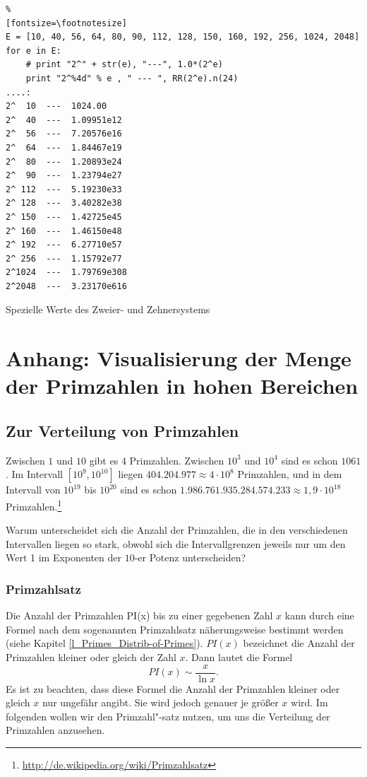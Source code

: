 \begin{refsegment}
\begin{sagecode}
\begin{Verbatim}%
[fontsize=\footnotesize]
E = [10, 40, 56, 64, 80, 90, 112, 128, 150, 160, 192, 256, 1024, 2048]
for e in E:
    # print "2^" + str(e), "---", 1.0*(2^e)
    print "2^%4d" % e , " --- ", RR(2^e).n(24)
....:
2^  10  ---  1024.00
2^  40  ---  1.09951e12
2^  56  ---  7.20576e16
2^  64  ---  1.84467e19
2^  80  ---  1.20893e24
2^  90  ---  1.23794e27
2^ 112  ---  5.19230e33
2^ 128  ---  3.40282e38
2^ 150  ---  1.42725e45
2^ 160  ---  1.46150e48
2^ 192  ---  6.27710e57
2^ 256  ---  1.15792e77
2^1024  ---  1.79769e308
2^2048  ---  3.23170e616
\end{Verbatim}
\caption{Spezielle Werte des Zweier- und Zehnersystems}
\end{sagecode}






\hypertarget{primes:_Appendix_Plotting-Primes-Quantity}{}
\section{Anhang: Visualisierung der Menge der Primzahlen in hohen Bereichen}
\label{primes:_Appendix_Plotting-Primes-Quantity}

\subsection*{Zur Verteilung von Primzahlen}
Zwischen $1$ und $10$ gibt es $4$ Primzahlen. Zwischen $10^3$ und $10^4$ sind
es schon $1061$. Im Intervall $[10^9,10^{10}]$ liegen
$404.204.977\approx 4\cdot 10^{8}$ Primzahlen, und in dem Intervall von
$10^{19}$ bis $10^{20}$ sind es schon $1.986.761.935.284.574.233\approx 1,9\cdot 10^{18}$
Primzahlen.\footnote{\url{http://de.wikipedia.org/wiki/Primzahlsatz}}

Warum unterscheidet sich die Anzahl der Primzahlen, die in den verschiedenen
Intervallen liegen so stark, obwohl sich die Intervallgrenzen jeweils nur um
den Wert 1 im Exponenten der $10$-er Potenz unterscheiden?


\subsubsection*{Primzahlsatz}
Die Anzahl der Primzahlen PI(x) bis zu einer gegebenen Zahl $x$ kann durch
eine Formel nach dem sogenannten Primzahlsatz näherungsweise bestimmt werden
(siehe Kapitel \ref{l_Primes_Distrib-of-Primes}).
$PI(x)$ bezeichnet die Anzahl der Primzahlen kleiner oder gleich der Zahl $x$.
Dann lautet die Formel
\[PI(x)\sim \frac{x}{\ln{x}}.\]
Es ist zu beachten, dass diese Formel die Anzahl der Primzahlen kleiner oder gleich $x$ nur
ungefähr angibt. Sie wird jedoch genauer je größer $x$ wird.
Im folgenden wollen wir den Primzahl"-satz nutzen, um uns die Verteilung der Primzahlen anzusehen.


\end{refsegment}
